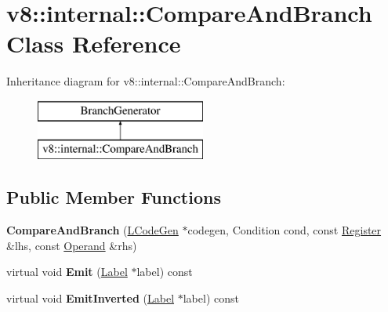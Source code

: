 \hypertarget{classv8_1_1internal_1_1_compare_and_branch}{}\section{v8\+:\+:internal\+:\+:Compare\+And\+Branch Class Reference}
\label{classv8_1_1internal_1_1_compare_and_branch}
Inheritance diagram for v8\+:\+:internal\+:\+:Compare\+And\+Branch\+:\begin{figure}[H]
\begin{center}
\leavevmode
\includegraphics[height=2.000000cm]{classv8_1_1internal_1_1_compare_and_branch}
\end{center}
\end{figure}
\subsection*{Public Member Functions}
\begin{DoxyCompactItemize}
\item 
{\bfseries Compare\+And\+Branch} (\hyperlink{classv8_1_1internal_1_1_l_code_gen}{L\+Code\+Gen} $\ast$codegen, Condition cond, const \hyperlink{structv8_1_1internal_1_1_register}{Register} \&lhs, const \hyperlink{classv8_1_1internal_1_1_operand}{Operand} \&rhs)\hypertarget{classv8_1_1internal_1_1_compare_and_branch_ae8aa00a5b499613d0b096a931e60c79b}{}\label{classv8_1_1internal_1_1_compare_and_branch_ae8aa00a5b499613d0b096a931e60c79b}

\item 
virtual void {\bfseries Emit} (\hyperlink{classv8_1_1internal_1_1_label}{Label} $\ast$label) const \hypertarget{classv8_1_1internal_1_1_compare_and_branch_a37acb9deb37bdd865b747531f4157953}{}\label{classv8_1_1internal_1_1_compare_and_branch_a37acb9deb37bdd865b747531f4157953}

\item 
virtual void {\bfseries Emit\+Inverted} (\hyperlink{classv8_1_1internal_1_1_label}{Label} $\ast$label) const \hypertarget{classv8_1_1internal_1_1_compare_and_branch_ab94f2e5fd403b96cb56f519c4a16611d}{}\label{classv8_1_1internal_1_1_compare_and_branch_ab94f2e5fd403b96cb56f519c4a16611d}

\end{DoxyCompactItemize}
